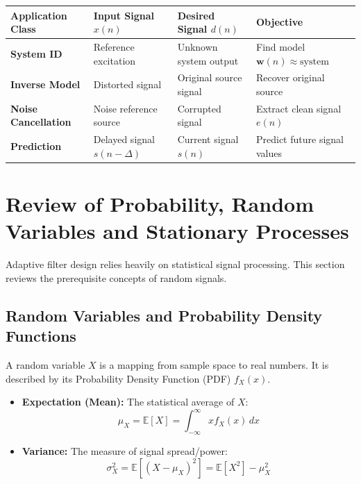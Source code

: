 \documentclass[12pt,a4paper]{article}
\renewcommand{\arraystretch}{1.45}
\begin{document}
\par\noindent
{\renewcommand{\arraystretch}{1.65}%
\begin{tabularx}{\linewidth}{|B{3.2cm}|Y|Y|Y|}\hline
\textbf{Application Class} & \textbf{Input Signal $x(n)$} & \textbf{Desired Signal $d(n)$} & \textbf{Objective} \\[4pt]
\hline
\textbf{System ID} & Reference excitation & Unknown system output & Find model $\mathbf{w}(n) \approx \text{system}$ \\[4pt]
\hline
\textbf{Inverse Model} & Distorted signal & Original source signal & Recover original source \\
\hline
\textbf{Noise Cancellation} & Noise reference source & Corrupted signal & Extract clean signal $e(n)$ \\[4pt]
\hline
\textbf{Prediction} & Delayed signal $s(n-\Delta)$ & Current signal $s(n)$ & Predict future signal values \\[4pt]
\hline
\end{tabularx}
}

\section{Review of Probability, Random Variables and Stationary Processes}

Adaptive filter design relies heavily on statistical signal processing. This section reviews the prerequisite concepts of random signals.

\subsection{Random Variables and Probability Density Functions}
A random variable $X$ is a mapping from sample space to real numbers. It is described by its Probability Density Function (PDF) $f_X(x)$.
\begin{itemize}[leftmargin=*, itemsep=2pt]
  \item \textbf{Expectation (Mean):} The statistical average of $X$:
  \begin{equation}
    \mu_X = \mathbb{E}[X] = \int_{-\infty}^{\infty} x f_X(x) \, dx
  \end{equation}
  \item \textbf{Variance:} The measure of signal spread/power:
  \begin{equation}
    \sigma_X^2 = \mathbb{E}[(X - \mu_X)^2] = \mathbb{E}[X^2] - \mu_X^2
  \end{equation}
\end{itemize}
\end{document}
